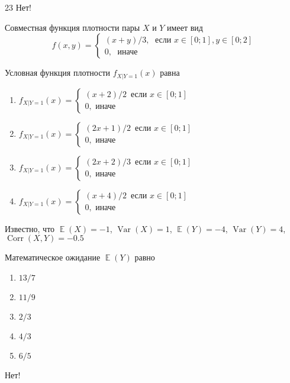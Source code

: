 \documentclass[t]{beamer}
\DeclareMathOperator{\Var}{Var}
\DeclareMathOperator{\Corr}{Corr}
\DeclareMathOperator{\E}{\mathbb{E}}
\begin{document}
 \begin{frame} \label{23-No} 
\begin{block}{23  \alert{Нет!} } 

Совместная функция плотности пары $X$ и $Y$ имеет вид
\[
f(x,y)=\begin{cases}
(x+y)/3, \; \text{ если } x\in[0;1], y\in [0;2] \\
0, \; \text{ иначе}
\end{cases}
\]

Условная функция плотности  $f_{X|Y=1}(x)$ равна
 \end{block} 
\begin{enumerate} 
\item[] \hyperlink{23-No}{\beamergotobutton{} $f_{X|Y=1}(x)=\begin{cases} (x+2)/2\, \text{ если } x\in [0;1] \\ 0, \text{ иначе }    \end{cases}$}
\item[] \hyperlink{23-No}{\beamergotobutton{} $f_{X|Y=1}(x)=\begin{cases} (2x+1)/2\, \text{ если } x\in [0;1] \\ 0, \text{ иначе }    \end{cases}$}
\item[] \hyperlink{23-Yes}{\beamergotobutton{} $f_{X|Y=1}(x)=\begin{cases} (2x+2)/3\, \text{ если } x\in [0;1] \\ 0, \text{ иначе }    \end{cases}$}
\item[] \hyperlink{23-No}{\beamergotobutton{} $f_{X|Y=1}(x)=\begin{cases} (x+4)/2\, \text{ если } x\in [0;1] \\ 0, \text{ иначе }    \end{cases}$}
\end{enumerate} 
\end{frame} 


 \begin{frame} \label{24-No} 
\begin{block}{24} 

Известно, что $\E(X)=-1$, $\Var(X)=1$, $\E(Y)=-4$, $\Var(Y)=4$, $\Corr(X,Y)=-0.5$

\vspace{0.5cm} 
 
Математическое ожидание $\E(Y)$ равно
 


 \end{block} 
\begin{enumerate} 
\item[] \hyperlink{24-No}{\beamergotobutton{} $13/7$
}
\item[] \hyperlink{24-Yes}{\beamergotobutton{} $11/9$}
\item[] \hyperlink{24-No}{\beamergotobutton{} $2/3$}
\item[] \hyperlink{24-No}{\beamergotobutton{} $4/3$}
\item[] \hyperlink{24-No}{\beamergotobutton{} $6/5$}
\end{enumerate} 

 \alert{Нет!} 
\end{frame} 
\end{document}
